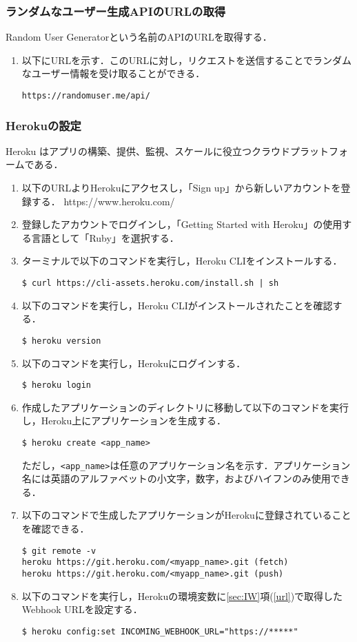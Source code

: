 \documentclass[12pt]{jsarticle}
\begin{document}
\subsubsection{ランダムなユーザー生成APIのURLの取得}\label{sec:api}
Random User Generatorという名前のAPIのURLを取得する．
\begin{enumerate}
\item 以下にURLを示す．このURLに対し，リクエストを送信することでランダムなユーザー情報を受け取ることができる．
\begin{verbatim}
https://randomuser.me/api/
\end{verbatim}
\end{enumerate}

\subsubsection{Herokuの設定}\label{sec5-2-4}
Heroku はアプリの構築、提供、監視、スケールに役立つクラウドプラットフォームである．
\begin{enumerate}
\item 以下のURLよりHerokuにアクセスし，「Sign up」から新しいアカウントを登録する．
  https://www.heroku.com/
\item 登録したアカウントでログインし，「Getting Started with Heroku」の使用する言語として「Ruby」を選択する．
\item ターミナルで以下のコマンドを実行し，Heroku CLIをインストールする．
\begin{verbatim}
$ curl https://cli-assets.heroku.com/install.sh | sh 
\end{verbatim} 
\item 以下のコマンドを実行し，Heroku CLIがインストールされたことを確認する．
\begin{verbatim}
$ heroku version
\end{verbatim}
\item 以下のコマンドを実行し，Herokuにログインする．
\begin{verbatim}
$ heroku login
\end{verbatim}
\item 作成したアプリケーションのディレクトリに移動して以下のコマンドを実行し，Heroku上にアプリケーションを生成する．
\begin{verbatim}
$ heroku create <app_name>
\end{verbatim}
ただし，\verb|<app_name>|は任意のアプリケーション名を示す．アプリケーション名には英語のアルファベットの小文字，数字，およびハイフンのみ使用できる．
\item 以下のコマンドで生成したアプリケーションがHerokuに登録されていることを確認できる．
\begin{verbatim}
$ git remote -v
heroku https://git.heroku.com/<myapp_name>.git (fetch)
heroku https://git.heroku.com/<myapp_name>.git (push)
\end{verbatim}
\item 以下のコマンドを実行し，Herokuの環境変数に\ref{sec:IW}項(\ref{url})で取得したWebhook URLを設定する．\label{item8}
\begin{verbatim}
$ heroku config:set INCOMING_WEBHOOK_URL="https://*****"
\end{verbatim}
\end{enumerate}
\end{document}
